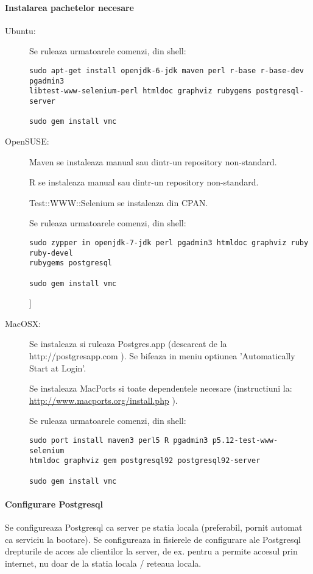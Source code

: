\paragraph{Instalarea pachetelor necesare}
\begin{description}
\item[Ubuntu:]
Se ruleaza urmatoarele comenzi, din shell:
\begin{lstlisting}[breaklines=true]
sudo apt-get install openjdk-6-jdk maven perl r-base r-base-dev pgadmin3
libtest-www-selenium-perl htmldoc graphviz rubygems postgresql-server

sudo gem install vmc
\end{lstlisting}

\item[OpenSUSE:]
Maven se instaleaza manual sau dintr-un repository non-standard.

R se instaleaza manual sau dintr-un repository non-standard.

Test::WWW::Selenium se instaleaza din CPAN.

Se ruleaza urmatoarele comenzi, din shell:
\begin{lstlisting}[breaklines=true]
sudo zypper in openjdk-7-jdk perl pgadmin3 htmldoc graphviz ruby ruby-devel
rubygems postgresql

sudo gem install vmc
\end{lstlisting}]

\item[MacOSX:]
Se instaleaza si ruleaza Postgres.app (descarcat de la http://postgresapp.com ).
Se bifeaza in meniu optiunea 'Automatically Start at Login'.

Se instaleaza MacPorts si toate dependentele necesare (instructiuni la:
\url{http://www.macports.org/install.php} ).

Se ruleaza urmatoarele comenzi, din shell:
\begin{lstlisting}[breaklines=true]
sudo port install maven3 perl5 R pgadmin3 p5.12-test-www-selenium
htmldoc graphviz gem postgresql92 postgresql92-server

sudo gem install vmc
\end{lstlisting}
\end{description}

\paragraph{Configurare Postgresql}
Se configureaza Postgresql ca server pe statia locala (preferabil, pornit
automat ca serviciu la bootare). 
Se configureaza in fisierele de configurare ale Postgresql drepturile
de acces ale clientilor la server, de ex. pentru a permite accesul prin
internet, nu doar de la statia locala / reteaua locala.

